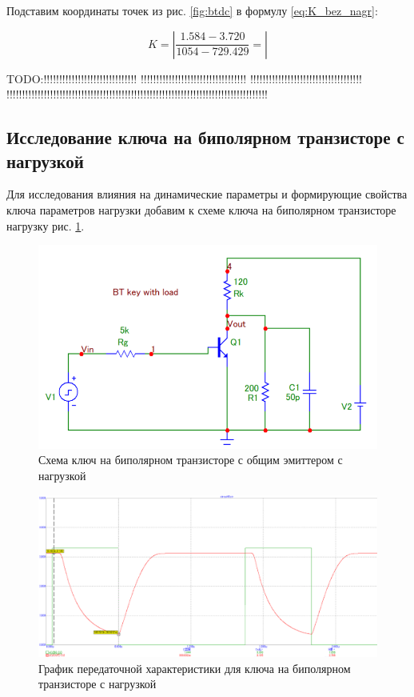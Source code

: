 \documentclass[a4paper,14pt]{article}
\begin{document}
Подставим координаты точек из рис. \ref{fig:btdc} в формулу \ref{eq:K_bez_nagr}:

\begin{equation}
K = \left|\dfrac{1.584 - 3.720}{1054 - 729.429} = \right|
\label{eq:K_bez_nagr_p}
\end{equation}

TODO:!!!!!!!!!!!!!!!!!!!!!!!!!!!!!! !!!!!!!!!!!!!!!!!!!!!!!!!!!!!!!!!! !!!!!!!!!!!!!!!!!!!!!!!!!!!!!!!!!!!! !!!!!!!!!!!!!!!!!!!!!!!!!!!!!!!!!!!!!!!!!!!!!!!!!!!!!!!!!!!!!!!!!!!!!!!!!!!!!!!!!!!!

\subsection{Исследование ключа на биполярном транзисторе с нагрузкой}

Для исследования влияния на динамические параметры и формирующие свойства ключа параметров нагрузки добавим к схеме ключа на биполярном транзисторе нагрузку рис. \ref{fig:btshnagr}.

\begin{figure}[H]
	\centering
	\includegraphics[width=0.7\linewidth]{image/BT_sh_nagr}
	\caption{Схема ключ на биполярном транзисторе с общим эмиттером с нагрузкой}
	\label{fig:btshnagr}
\end{figure}

\begin{figure}[H]
	\centering
	\includegraphics[width=0.7\linewidth]{image/BT_graf_nagr}
	\caption{График передаточной характеристики для ключа на биполярном транзисторе с нагрузкой}
	\label{fig:btgrafnagr}
\end{figure}
\end{document}
